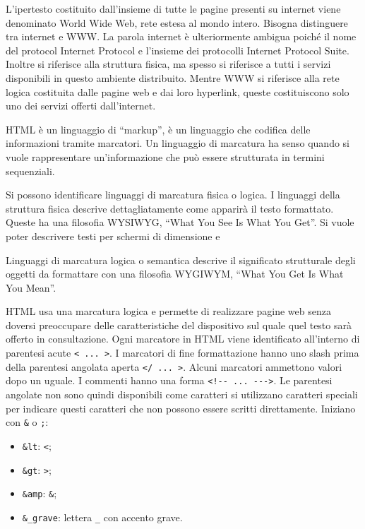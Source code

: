 \documentclass{article}
\numberwithin{equation}{subsection}
\begin{document}
L'ipertesto costituito dall'insieme di tutte le pagine presenti su internet viene denominato World Wide Web, rete estesa al mondo intero. 
Bisogna distinguere tra internet e WWW. La parola internet è ulteriormente ambigua poiché il nome del protocol Internet Protocol e l'insieme dei protocolli Internet Protocol Suite. 
Inoltre si riferisce alla struttura fisica, ma spesso si riferisce a tutti i servizi disponibili in questo ambiente distribuito. 
Mentre WWW si riferisce alla rete logica costituita dalle pagine web e dai loro hyperlink, queste costituiscono solo uno dei servizi offerti dall'internet. 


HTML è un linguaggio di ``markup'', è un linguaggio che codifica delle informazioni tramite marcatori. Un linguaggio di marcatura ha senso quando si vuole rappresentare 
un'informazione che può essere strutturata in termini sequenziali. 

Si possono identificare linguaggi di marcatura fisica o logica. I linguaggi della struttura fisica descrive dettagliatamente come apparirà il testo formattato. 
Queste ha una filosofia WYSIWYG, ``What You See Is What You Get''. Si vuole poter descrivere testi per schermi di dimensione e 


Linguaggi di marcatura logica o semantica descrive il significato strutturale degli oggetti da formattare con una filosofia WYGIWYM, ``What You Get Is What You Mean''. 

HTML usa una marcatura logica e permette di realizzare pagine web senza doversi preoccupare delle caratteristiche del dispositivo sul quale quel testo sarà offerto in 
consultazione. 
Ogni marcatore in HTML viene identificato all'interno di parentesi acute \verb|< ... >|. I marcatori di fine formattazione hanno uno slash prima della parentesi angolata 
aperta \verb|</ ... >|. Alcuni marcatori ammettono valori dopo un uguale. 
I commenti hanno una forma \verb|<!-- ... --->|.
Le parentesi angolate non sono quindi disponibili come caratteri si utilizzano caratteri speciali per indicare questi caratteri che non possono essere scritti 
direttamente. Iniziano con \verb|&| o \verb|;|:
\begin{itemize}
    \item \verb|&lt|: \verb|<|;
    \item \verb|&gt|: \verb|>|;
    \item \verb|&amp|: \verb|&|;
    \item \verb|&_grave|: lettera \verb|_| con accento grave. 
\end{itemize} 
\end{document}
